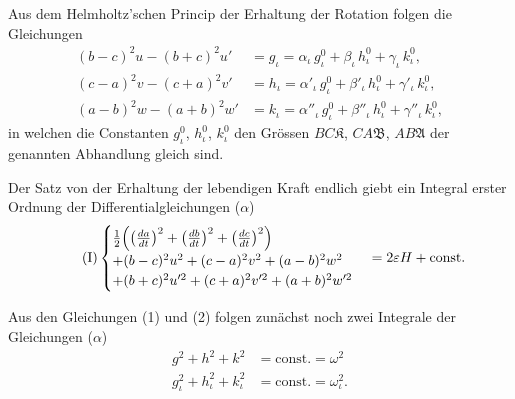 \documentclass[12pt,a4paper]{book}
\theoremstyle{definition}
\theoremstyle{remark}
\begin{document}
Aus dem Helmholtz'schen Princip der Erhaltung der Rotation folgen die Gleichungen
\begin{equation}
\tag{2}
\begin{aligned}
(b-c)^2u - (b+c)^2u' &= g_\iota = \alpha_\iota\,g^0_\iota + \beta_\iota\,h^0_\iota + \gamma_\iota\,k^0_\iota,\\
(c-a)^2v - (c+a)^2v' &= h_\iota = \alpha'_\iota\,g^0_\iota + \beta'_\iota\,h^0_\iota + \gamma'_\iota\,k^0_\iota,\\
(a-b)^2w - (a+b)^2w' &= k_\iota = \alpha''_{\iota}\,g^0_\iota + \beta''_{\iota}\,h^0_\iota + \gamma''_{\iota}\,k^0_\iota,
\end{aligned}
\end{equation}
in welchen die Constanten $g^0_\iota$, $h^0_\iota$, $k^0_\iota$ den Grössen $BC\mathfrak{K}$, $CA\mathfrak{B}$, $AB\mathfrak{A}$ der genannten Abhandlung gleich sind.

Der Satz von der Erhaltung der lebendigen Kraft endlich giebt ein Integral erster Ordnung der Differentialgleichungen ($\alpha$)
\begin{equation}
\tag{I}
\begin{cases}
\tfrac{1}{2}\Bigl(\bigl(\frac{da}{dt}\bigr)^2 + \bigl(\frac{db}{dt}\bigr)^2 + \bigl(\frac{dc}{dt}\bigr)^2\Bigr)\\
+ (b-c)^2u^2 + (c-a)^2v^2 + (a-b)^2w^2\\
+ (b+c)^2u'^2 + (c+a)^2v'^2 + (a+b)^2w'^2
\end{cases}
= 2\varepsilon H + \text{const.}
\end{equation}

Aus den Gleichungen (1) und (2) folgen zunächst noch zwei Integrale der Gleichungen ($\alpha$)
\begin{align*}
\tag{II} g^2 + h^2 + k^2 &= \text{const.} = \omega^2\\
\tag{III} g_\iota^2 + h_\iota^2 + k_\iota^2 &= \text{const.} = \omega_\iota^2.
\end{align*}
\end{document}
